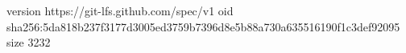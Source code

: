 version https://git-lfs.github.com/spec/v1
oid sha256:5da818b237f3177d3005ed3759b7396d8e5b88a730a635516190f1c3def92095
size 3232
